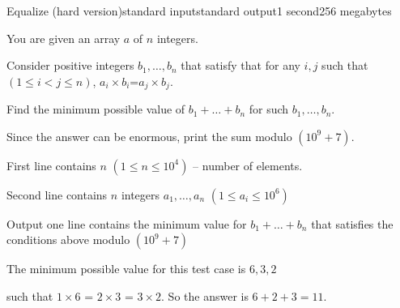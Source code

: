 \begin{problem}{Equalize (hard version)}{standard input}{standard output}{1 second}{256 megabytes}

You are given an array $a$ of $n$ integers.

Consider positive integers $b_1$$,\dots,$$b_n$ that satisfy that for any $i,j$ such that $(1\le i < j \le n)$, $a_i \times b_i$=$a_j \times b_j$.

Find the minimum possible value of 
$b_1 +\dots+ b_n$ for such $b_1,\dots,b_n$.

Since the answer can be enormous, print the sum modulo $(10^9+7)$.

\InputFile
First line contains $n$ $(1\le n\le 10^4 )$ -- number of elements.

Second line contains $n$ integers $a_1,\dots,a_n$ $(1\le a_i \le 10^6)$ 

\OutputFile
Output one line contains the minimum value for $b_1 +\dots+ b_n$ that satisfies the conditions above modulo $(10^9+7)$

\Example

\begin{example}
%
\end{example}

\Note
The minimum possible value for this test case is $6,3,2$

such that $1\times 6$ = $2 \times 3$ = $3\times 2$. So the answer is $6+2+3=11$.

\end{problem}

